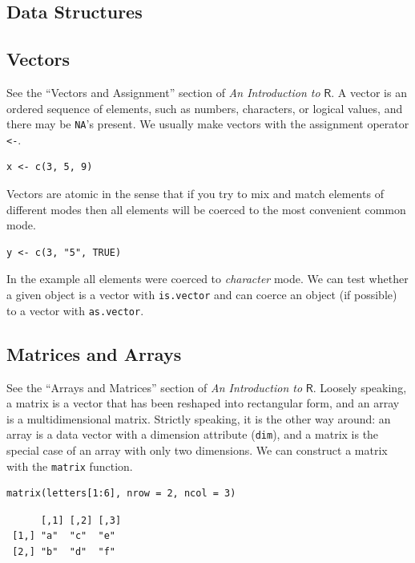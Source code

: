 \documentclass[captions=tableheading]{scrbook}
\begin{document}
\begin{example}
\section{Data Structures}
\label{sec-20-1}
\label{sec-Data-Structures}
\subsection{Vectors}
\label{sec-20-1-1}


See the ``Vectors and Assignment'' section of \emph{An Introduction to} \(\mathsf{R}\). A vector is an ordered sequence of elements, such as numbers, characters, or logical values, and there may be \texttt{NA}'s present. We usually make vectors with the assignment operator \texttt{<-}.


\lstset{language=R}
\begin{lstlisting}
x <- c(3, 5, 9)
\end{lstlisting}


Vectors are atomic in the sense that if you try to mix and match elements of different modes then all elements will be coerced to the most convenient common mode.


\lstset{language=R}
\begin{lstlisting}
y <- c(3, "5", TRUE)
\end{lstlisting}


In the example all elements were coerced to \emph{character} mode. We can test whether a given object is a vector with \texttt{is.vector} and can coerce an object (if possible) to a vector with \texttt{as.vector}.
\subsection{Matrices and Arrays}
\label{sec-20-1-2}


See the ``Arrays and Matrices'' section of \emph{An Introduction to} \(\mathsf{R}\). Loosely speaking, a matrix is a vector that has been reshaped into rectangular form, and an array is a multidimensional matrix. Strictly speaking, it is the other way around: an array is a data vector with a dimension attribute (\texttt{dim}), and a matrix is the special case of an array with only two dimensions. We can construct a matrix with the \texttt{matrix} function. 


\lstset{language=R}
\begin{lstlisting}
matrix(letters[1:6], nrow = 2, ncol = 3)
\end{lstlisting}

\begin{verbatim}
      [,1] [,2] [,3]
 [1,] "a"  "c"  "e" 
 [2,] "b"  "d"  "f"
\end{verbatim}


\end{example}
\end{document}
